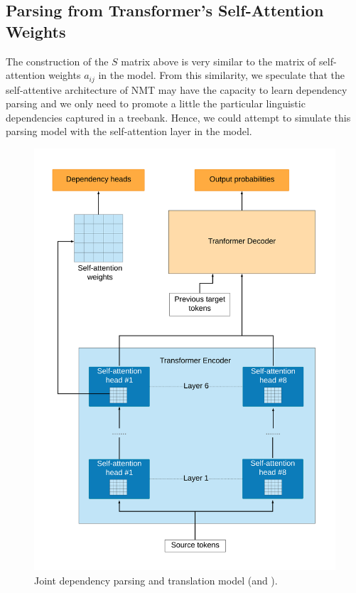 \subsection{Parsing from Transformer's Self-Attention Weights}
\label{multitask-dep-parsing}

The construction of the $S$ matrix above is very similar to the matrix of self-attention weights $a_{ij}$ in the \transformer model.
From this similarity, we speculate that the self-attentive architecture of \transformer NMT may have the capacity to learn dependency parsing and we only need to promote a little the particular linguistic dependencies captured in a treebank. Hence, we could attempt to simulate this parsing model with the self-attention layer in the \transformer model.

\begin{figure}[t]
    \includegraphics[width=\textwidth]{img/Joint_Translation_DepParse}
    \caption{Joint dependency parsing and translation model (\DepParse and \DiagonalParse).}
    \label{fig:joint_trans_depparse}
\end{figure}

